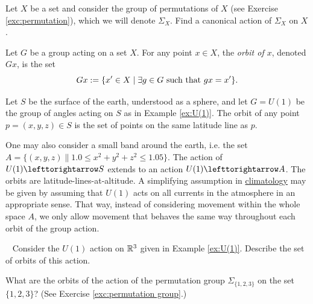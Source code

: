 \begin{exampleRUS}\label{ex:U(1)}
\end{exampleRUS}

\begin{exerciseENG}\label{exc:permutation group}
Let $X$ be a set and consider the group of permutations of $X$ (see Exercise \ref{exc:permutation}), which we will denote $\Sigma_X$. Find a canonical action of $\Sigma_X$ on $X$.
\end{exerciseENG}

\begin{exerciseRUS}\label{exc:permutation group}
\end{exerciseRUS}

\begin{definitionENG}
Let $G$ be a group acting on a set $X$. For any point $x\in X$, the {\em orbit of $x$}, denoted $Gx$, is the set 
$$Gx:=\{x'\in X{\;|\;}\exists g\in G \textnormal{ such that }gx=x'\}.$$
\end{definitionENG}

\begin{definitionRUS}
\end{definitionRUS}

\begin{applicationENG}
Let $S$ be the surface of the earth, understood as a sphere, and let $G=U(1)$ be the group of angles acting on $S$ as in Example \ref{ex:U(1)}. The orbit of any point $p=(x,y,z)\in S$ is the set of points on the same latitude line as $p$.

One may also consider a small band around the earth, i.e. the set $A=\{(x,y,z)\|1.0\leq x^2+y^2+z^2\leq 1.05\}$. The action of $U(1)\acts S$ extends to an action $U(1)\acts A$. The orbits are latitude-lines-at-altitude. A simplifying assumption in \href{http://en.wikipedia.org/wiki/Climatology}{\text climatology} may be given by assuming that $U(1)$ acts on all currents in the atmosphere in an appropriate sense. That way, instead of considering movement within the whole space $A$, we only allow movement that behaves the same way throughout each orbit of the group action.
\end{applicationENG}

\begin{applicationRUS}
\end{applicationRUS}

\begin{exerciseENG}~
\sexc Consider the $U(1)$ action on ${\mathbb R}^3$ given in Example \ref{ex:U(1)}. Describe the set of orbits of this action.
\item What are the orbits of the action of the permutation group $\Sigma_{\{1,2,3\}}$ on the set $\{1,2,3\}$? (See Exercise \ref{exc:permutation group}.)
\endsexc
\end{exerciseENG}

